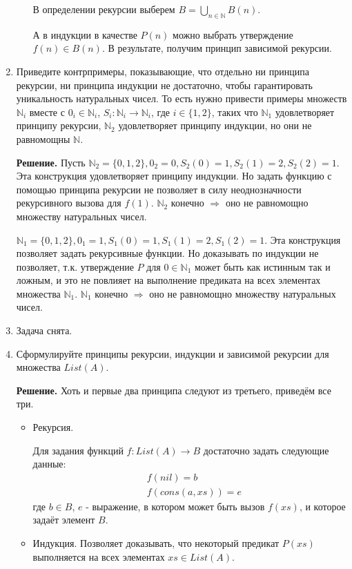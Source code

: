 \begin{enumerate}
\begin{itemize}
	В определении рекурсии выберем $B = \bigcup\limits_{n\in \mathbb{N}} B(n)$.
	
	А в индукции в качестве $P(n)$ можно выбрать утверждение $f(n) \in B(n)$. В результате, получим принцип 
	зависимой рекурсии.
\end{itemize}

\item Приведите контрпримеры, показывающие, что отдельно ни принципа рекурсии, ни принципа 
индукции не достаточно, чтобы гарантировать уникальность натуральных чисел.
    То есть нужно привести примеры множеств $\mathbb{N}_i$ вместе с $0_i \in \mathbb{N}_i$, $S_i 
    : \mathbb{N}_i \to \mathbb{N}_i$, где $i \in \{ 1, 2 \}$,
    таких что $\mathbb{N}_1$ удовлетворяет принципу рекурсии, $\mathbb{N}_2$ удовлетворяет 
    принципу индукции, но они не равномощны $\mathbb{N}$.
    
\textbf{Решение.} Пусть $\mathbb{N}_2 = \{0,1,2\}, 0_2 = 0, S_2(0) = 1, S_2(1) = 2, S_2(2) = 1$. Эта конструкция 
удовлетворяет принципу индукции. Но задать функцию с помощью принципа рекурсии не позволяет в силу 
неоднозначности рекурсивного вызова для $f(1)$. $\mathbb{N}_2$ конечно $\Rightarrow$ оно не равномощно множеству 
натуральных чисел. 

$\mathbb{N}_1 = \{0,1,2\}, 0_1 = 1, S_1(0) = 1, S_1(1) = 2, S_1(2) = 1$. Эта конструкция позволяет задать 
рекурсивные функции. Но доказывать по индукции не позволяет, т.к. утверждение $P$ для $0\in \mathbb{N}_1$ может 
быть как истинным так и ложным, и это не повлияет на выполнение предиката на всех элементах множества 
$\mathbb{N}_1$. $\mathbb{N}_1$ конечно $\Rightarrow$ оно не равномощно множеству натуральных чисел. 

\item Задача снята.

\item Сформулируйте принципы рекурсии, индукции и зависимой рекурсии для множества $List(A)$.

\textbf{Решение.} Хоть и первые два принципа следуют из третьего, приведём все три.

\begin{itemize}
	\item Рекурсия.
	
	Для задания функций $f:List(A) \rightarrow B$ достаточно задать следующие данные:
	\begin{align*}
		&f(nil) = b \\
		&f(cons(a, xs))= e 
	\end{align*}
	где $b \in B$, $e$ - выражение, в котором может быть вызов $f(xs)$, и которое задаёт 
	элемент $B$.
	\item Индукция. Позволяет доказывать, что некоторый предикат $P(xs)$ выполняется на всех 
	элементах $xs \in List(A)$.
	

\end{itemize}
\end{enumerate}
